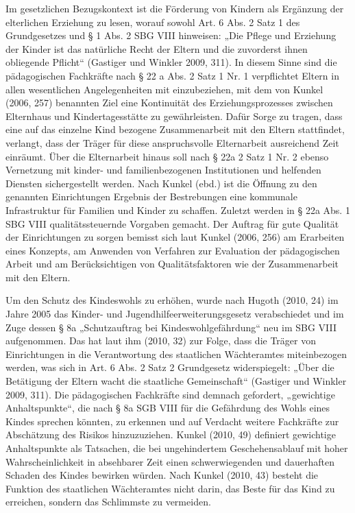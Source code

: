 Im gesetzlichen Bezugskontext ist die Förderung von Kindern als Ergänzung der elterlichen Erziehung zu lesen, worauf sowohl Art. 6 Abs. 2 Satz 1 des Grundgesetzes und § 1 Abs. 2 SBG VIII hinweisen: „Die Pflege und Erziehung der Kinder ist das natürliche Recht der Eltern und die zuvorderst ihnen obliegende Pflicht“ (Gastiger und Winkler 2009, 311). In diesem Sinne sind die pädagogischen Fachkräfte nach § 22 a Abs. 2 Satz 1 Nr. 1  verpflichtet Eltern in allen wesentlichen Angelegenheiten mit einzubeziehen, mit dem von Kunkel (2006, 257) benannten Ziel eine Kontinuität des Erziehungsprozesses zwischen Elternhaus und Kindertagesstätte zu gewährleisten. Dafür Sorge zu tragen, dass eine auf das einzelne Kind bezogene Zusammenarbeit mit den Eltern stattfindet, verlangt, dass der Träger für diese anspruchsvolle Elternarbeit ausreichend Zeit einräumt. Über die Elternarbeit hinaus soll nach § 22a 2 Satz 1 Nr. 2 ebenso Vernetzung mit kinder- und familienbezogenen Institutionen und helfenden Diensten sichergestellt werden. Nach Kunkel (ebd.) ist die Öffnung zu den genannten Einrichtungen Ergebnis der Bestrebungen eine kommunale Infrastruktur für Familien und Kinder zu schaffen. Zuletzt werden in § 22a Abs. 1 SBG VIII qualitätssteuernde Vorgaben gemacht. Der Auftrag für gute Qualität der Einrichtungen zu sorgen bemisst sich laut Kunkel (2006, 256) am Erarbeiten eines Konzepts, am Anwenden von Verfahren zur Evaluation der pädagogischen Arbeit und am Berücksichtigen von Qualitätsfaktoren wie der Zusammenarbeit mit den Eltern.

Um den Schutz des Kindeswohls zu erhöhen, wurde nach Hugoth (2010, 24) im Jahre 2005 das Kinder- und Jugendhilfeerweiterungsgesetz verabschiedet und im Zuge dessen § 8a „Schutzauftrag bei Kindeswohlgefährdung“ neu im SBG VIII aufgenommen. Das hat laut ihm (2010, 32) zur Folge, dass die Träger von Einrichtungen in die Verantwortung des staatlichen Wächteramtes miteinbezogen werden, was sich in Art. 6 Abs. 2 Satz 2 Grundgesetz widerspiegelt: „Über die Betätigung der Eltern wacht die staatliche Gemeinschaft“ (Gastiger und Winkler 2009, 311). Die pädagogischen Fachkräfte sind demnach gefordert, „gewichtige Anhaltspunkte“, die nach § 8a SGB VIII für die Gefährdung des Wohls eines Kindes sprechen könnten, zu erkennen und auf Verdacht weitere Fachkräfte zur Abschätzung des Risikos hinzuzuziehen. Kunkel (2010, 49) definiert gewichtige Anhaltspunkte als Tatsachen, die bei ungehindertem Geschehensablauf mit hoher Wahrscheinlichkeit in absehbarer Zeit einen schwerwiegenden und dauerhaften Schaden des Kindes bewirken würden. Nach Kunkel (2010, 43) besteht die Funktion des staatlichen Wächteramtes nicht darin, das Beste für das Kind zu erreichen, sondern das Schlimmste zu vermeiden.

